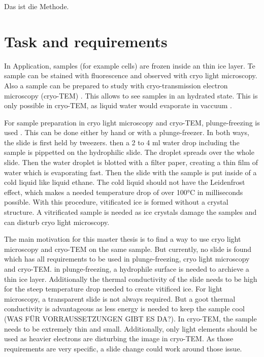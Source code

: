 
Das ist die Methode.

\section{Task and requirements}

In Application, samples (for example cells) are frozen inside an thin ice layer. Te sample can be stained with fluorescence and observed with cryo light microscopy. Also a sample can be prepared to study with cryo-transmission electron microscopy (cryo-TEM) . This allows to see samples in an hydrated state. This is only possible in cryo-TEM, as liquid water would evaporate in vaccuum \cite{Danino.2012}.

For sample preparation in cryo light microscopy and cryo-TEM, plunge-freezing is used \cite{Danino.2012} \cite{Faoro.2018}. This can be done either by hand or with a plunge-freezer. In both ways, the slide is first held by tweezers. then a 2 to 4 ml water drop including the sample is pippetted on the hydrophilic slide. The droplet spreads over the whole slide. Then the water droplet is blotted with a filter paper, creating a thin film of water which is evaporating fast. Then the slide with the sample is put inside of a cold liquid like liquid ethane. The cold liquid should not have the Leidenfrost effect, which makes a needed temperature drop of over 100°C in milliseconds possible. With this procedure, vitificated ice is formed without a crystal structure. A vitrificated sample is needed as ice crystals damage the samples and can disturb cryo light microscopy.

The main motivation for this master thesis is to find a way to use cryo light microscopy and cryo-TEM on the same sample. But currently, no slide is found which has all requirements to be used in plunge-freezing, cryo light microscopy and cryo-TEM. in plunge-freezing, a hydrophile surface is needed to archieve a thin ice layer. Additionally the thermal conductivity of the slide needs to be high for the steep temperature drop needed to create vitificed ice. For light microscopy, a transparent slide is not always required. But a goot thermal conductivity is advantageous as less energy is needed to keep the sample cool (WAS FÜR VORRAUSSETZUNGEN GIBT ES DA?). In cryo-TEM, the sample needs to be extremely thin and small. Additionally, only light elements should be used as heavier electrons are disturbing the image in cryo-TEM. As those requirements are very specific, a slide change could work around those issue.

